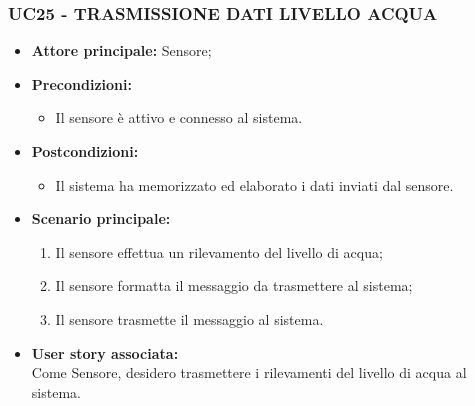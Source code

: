 \subsubsection{UC25 - TRASMISSIONE DATI LIVELLO ACQUA}
\begin{itemize}
    \item \textbf{Attore principale:} Sensore;
    \item \textbf{Precondizioni:}
        \begin{itemize}
            \item Il sensore è attivo e connesso al sistema. 
        \end{itemize}
    \item \textbf{Postcondizioni:}
        \begin{itemize}
            \item Il sistema ha memorizzato ed elaborato i dati inviati dal sensore.
        \end{itemize}
    \item \textbf{Scenario principale:}
        \begin{enumerate}
            \item Il sensore effettua un rilevamento del livello di acqua;
            \item Il sensore formatta il messaggio da trasmettere al sistema;
            \item Il sensore trasmette il messaggio al sistema.
        \end{enumerate}
    \item \textbf{User story associata:} \\
    Come Sensore, desidero trasmettere i rilevamenti del livello di acqua al sistema.
\end{itemize}